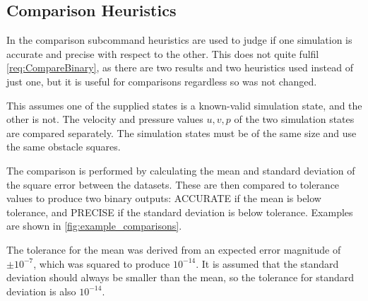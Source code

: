 \subsection{Comparison Heuristics}\label{sec:Comparisons}
In the comparison subcommand heuristics are used to judge if one simulation is accurate and precise with respect to the other.
This does not quite fulfil \cref{req:CompareBinary}, as there are two results and two heuristics used instead of just one, but it is useful for comparisons regardless so was not changed.

This assumes one of the supplied states is a known-valid simulation state, and the other is not.
The velocity and pressure values $u, v, p$ of the two simulation states are compared separately.
The simulation states must be of the same size and use the same obstacle squares.

The comparison is performed by calculating the mean and standard deviation of the square error between the datasets.
These are then compared to tolerance values to produce two binary outputs: ACCURATE if the mean is below tolerance, and PRECISE if the standard deviation is below tolerance.
Examples are shown in \cref{fig:example_comparisons}.

The tolerance for the mean was derived from an expected error magnitude of $\pm 10^{-7}$, which was squared to produce $10^{-14}$.
It is assumed that the standard deviation should always be smaller than the mean, so the tolerance for standard deviation is also $10^{-14}$.

